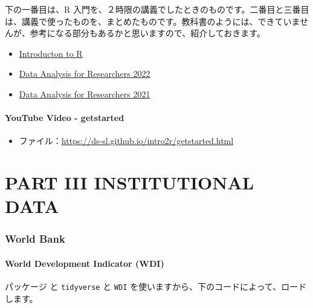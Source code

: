 \documentclass[
]{bxjsbook}
\providecommand{\tightlist}{%
  \setlength{\itemsep}{0pt}\setlength{\parskip}{0pt}}
\theoremstyle{definition}
\theoremstyle{definition}
\theoremstyle{definition}
\theoremstyle{definition}
\theoremstyle{remark}
\begin{document}
下の一番目は、R 入門を、２時限の講義でしたときのものです。二番目と三番目は、講義で使ったものを、まとめたものです。教科書のようには、できていませんが、参考になる部分もあるかと思いますので、紹介しておきます。

\begin{itemize}
\tightlist
\item
  \href{https://ds-sl.github.io/intro2r/intro2r.nb.html}{Introducton to R}
\item
  \href{https://icu-hsuzuki.github.io/da4r2022/}{Data Analysis for Researchers 2022}
\item
  \href{https://icu-hsuzuki.github.io/da4r2021/}{Data Analysis for Researchers 2021}
\end{itemize}

\hypertarget{youtube-video---getstarted}{%
\subsection{YouTube Video - getstarted}\label{youtube-video---getstarted}}

\begin{itemize}
\tightlist
\item
  ファイル：\url{https://ds-sl.github.io/intro2r/getstarted.html}
\end{itemize}

\hypertarget{part-part-iii-institutional-data}{%
\part{PART III INSTITUTIONAL DATA}\label{part-part-iii-institutional-data}}

\hypertarget{worldbank}{%
\section{World Bank}\label{worldbank}}

\hypertarget{world-development-indicator-wdi}{%
\subsection{World Development Indicator (WDI)}\label{world-development-indicator-wdi}}

パッケージ と \texttt{tidyverse} と \texttt{WDI} を使いますから、下のコードによって、ロードします。
\end{document}
